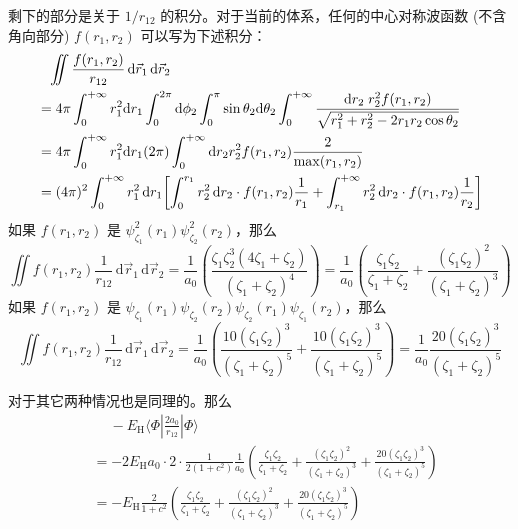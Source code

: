 剩下的部分是关于 $1/r_{12}$ 的积分。对于当前的体系，任何的中心对称波函数 (不含角向部分) $f(r_1, r_2)$ 可以写为下述积分：
\begin{align*}
    &\phantom{=} {}\iint  \frac{f(r_1, r_2)}{r_{12}} \, \mathrm{d} \vec{r}_1 \, \mathrm{d} \vec{r}_2 \\
    &= 4\pi \int_0^{+\infty} r_1^2 \mathrm{d} r_1 \int_0^{2\pi} \mathrm{d}\phi_2 \int_0^\pi \sin\theta_2 \mathrm{d}\theta_2 \int_0^{+\infty}   \dfrac{\mathrm{d} r_2 \;r_2^2 f(r_1, r_2) }{\sqrt{r_1^2 + r_2^2 - 2r_1 r_2\cos\theta_2}} \notag\\
    &= 4\pi \int_0^{+\infty} r_1^2 \mathrm{d} r_1  (2\pi)  \int_0^{+\infty}  \mathrm{d} r_2 r_2^2 f(r_1, r_2) \dfrac{2}{\max(r_1,r_2)} \notag\\
    &= (4 \pi)^2 \int_0^{+\infty} r_1^2 \, \mathrm{d} r_1 
    \qty[\int_0^{r_1} r_2^2 \, \mathrm{d} r_2 \cdot f(r_1, r_2) \frac{1}{r_1}
    + \int_{r_1}^{+\infty} r_2^2 \, \mathrm{d} r_2 \cdot f(r_1, r_2) \frac{1}{r_2}]
\end{align*}
如果 $f(r_1, r_2)$ 是 $\psi_{\zeta_1}^2 (r_1) \psi_{\zeta_2}^2 (r_2)$，那么
\begin{equation*}
    \iint f(r_1, r_2) \frac{1}{r_{12}} \, \mathrm{d} \vec{r}_1 \, \mathrm{d} \vec{r}_2
    = \frac{1}{a_0} \left( \frac{\zeta_1 \zeta_2^3 (4 \zeta_1 + \zeta_2)}{(\zeta_1 + \zeta_2)^4} \right)
    = \frac{1}{a_0} \left( \frac{\zeta_1 \zeta_2}{\zeta_1 + \zeta_2} + \frac{(\zeta_1 \zeta_2)^2}{(\zeta_1 + \zeta_2)^3} \right)
\end{equation*}
如果 $f(r_1, r_2)$ 是 $\psi_{\zeta_1} (r_1) \psi_{\zeta_2} (r_2) \psi_{\zeta_2} (r_1) \psi_{\zeta_1} (r_2)$，那么
\begin{equation*}
    \iint f(r_1, r_2) \frac{1}{r_{12}} \, \mathrm{d} \vec{r}_1 \, \mathrm{d} \vec{r}_2
    = \frac{1}{a_0} \left( \frac{10 (\zeta_1 \zeta_2)^3}{(\zeta_1 + \zeta_2)^5} + \frac{10 (\zeta_1 \zeta_2)^3}{(\zeta_1 + \zeta_2)^5} \right)
    = \frac{1}{a_0} \frac{20 (\zeta_1 \zeta_2)^3}{(\zeta_1 + \zeta_2)^5}
\end{equation*}





对于其它两种情况也是同理的。那么%
\begin{align*}
    &\quad\ - E_\mathrm{H} \langle \Phi | \frac{2 a_0}{r_{12}} | \Phi \rangle \\
    &= - 2 E_\mathrm{H} a_0 \cdot 2 \cdot \frac{1}{2 (1 + c^2)} \frac{1}{a_0} \left( \frac{\zeta_1 \zeta_2}{\zeta_1 + \zeta_2} + \frac{(\zeta_1 \zeta_2)^2}{(\zeta_1 + \zeta_2)^3} + \frac{20 (\zeta_1 \zeta_2)^3}{(\zeta_1 + \zeta_2)^5} \right) \\
    &= - E_\mathrm{H} \frac{2}{1 + c^2} \left( \frac{\zeta_1 \zeta_2}{\zeta_1 + \zeta_2} + \frac{(\zeta_1 \zeta_2)^2}{(\zeta_1 + \zeta_2)^3} + \frac{20 (\zeta_1 \zeta_2)^3}{(\zeta_1 + \zeta_2)^5} \right)
\end{align*}





